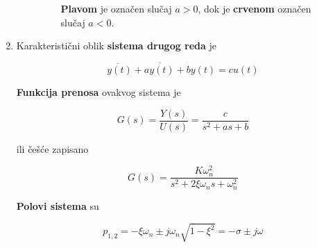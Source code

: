\documentclass[12pt]{IEEEtran}
\numberwithin{equation}{subsection}
\numberwithin{figure}{section}
\begin{document}
\begin{enumerate}
\begin{enumerate}
                    \begin{figure}[h]
                        \centering
                        \caption{\textbf{Plavom} je ozna\v{c}en slu\v{c}aj $a > 0$, dok je
                            \textbf{crvenom} ozna\v{c}en slu\v{c}aj $a < 0$.}
                    \end{figure}

          \end{enumerate}
          \newpage
    \item
          Karakteristi\v{c}ni oblik \textbf{sistema drugog reda} je

          \begin{equation}
              \ddot{y(t)} + a\dot{y(t)} + by(t) = cu(t)
          \end{equation}

          \textbf{Funkcija prenosa} ovakvog sistema je

          \begin{equation}
              G(s) = \frac{Y(s)}{U(s)} = \frac{c}{s^2 + as + b}
          \end{equation}

          ili \v{c}e\v{s}\'{c}e zapisano

          \begin{equation}
              G(s) = \frac{K\omega_{n}^2}{s^2 + 2\xi\omega_{n}s + \omega_{n}^2}
          \end{equation}

          \textbf{Polovi sistema} su

          \begin{equation}
              p_{1, 2} = -\xi\omega_{n} \pm j\omega_{n}\sqrt{1 - \xi^2} = -\sigma \pm j\omega
          \end{equation}


\end{enumerate}
\end{document}
